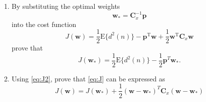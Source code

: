 \begin{enumerate}
  \begin{enumerate}
  \item
    By substituting the optimal weights
    \begin{equation}
      \mathbf{w}_* = \mathbf{C}_x^{-1} \mathbf{p}
      \label{eq:w_optimal}
    \end{equation}
    into the cost function
    \begin{equation}
      J(\mathbf{w}) = \frac{1}{2} \mathrm{E}\{d^2(n)\} -
      \mathbf{p}^{\mathrm{T}}\mathbf{w} +
      \frac{1}{2}\mathbf{w}^{\mathrm{T}} \mathbf{C}_x \mathbf{w}
      \label{eq:J}
    \end{equation}
    prove that
    \begin{equation}
      J(\mathbf{w}_*) = \frac{1}{2} \mathrm{E}\{ d^2(n) \} - \frac{1}{2}
      \mathbf{p}^T \mathbf{w}_*.
      \label{eq:J2}
    \end{equation}
    
  \item Using \eqref{eq:J2}, prove that \eqref{eq:J} can be expressed as
    \begin{equation*}
      J(\mathbf{w}) = J(\mathbf{w}_*) + \frac{1}{2}( \mathbf{w} -
      \mathbf{w}_*)^T \mathbf{C}_x (\mathbf{w} - \mathbf{w}_*)
    \end{equation*}
  \end{enumerate}

  \begin{solution}


\end{solution}
\end{enumerate}
